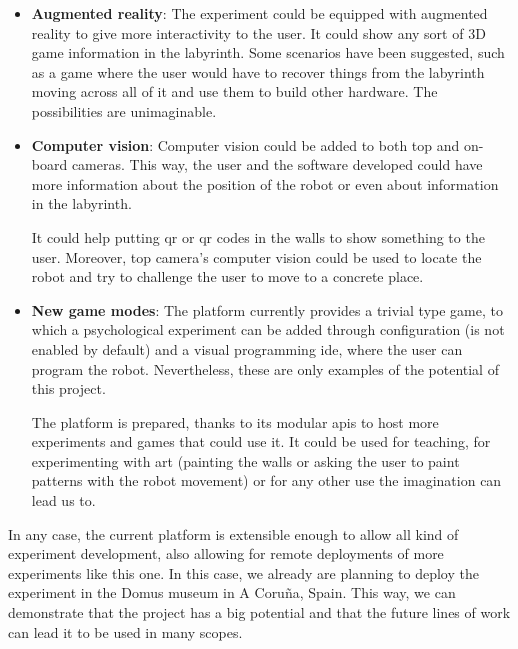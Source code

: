 \begin{itemize}

	\item \textbf{Augmented reality}: The experiment could be equipped with augmented reality to give
	more interactivity to the user. It could show any sort of 3D game information in the labyrinth. Some
	scenarios have been suggested, such as a game where the user would have to recover things from the
	labyrinth moving across all of it and use them to build other hardware. The possibilities are
	unimaginable.

	\item \textbf{Computer vision}: Computer vision could be added to both top and on-board cameras.
	This way, the user and the software developed could have more information about the position of the
	robot or even about information in the labyrinth.

	It could help putting \acrshort{qr} or
	\acrlong{qr} codes in the walls to show something to the user. Moreover, top camera's computer
	vision could be used to locate the robot and try to challenge the user to move to a concrete place.

	\item \textbf{New game modes}: The platform currently provides a trivial type game, to which a
	psychological experiment can be added through configuration (is not enabled by default) and a visual
	programming \acrshort{ide}, where the user can program the robot. Nevertheless, these are only
	examples of the potential of this project.

	The platform is prepared, thanks to its modular \acrshort{api}s to host more experiments and games
	that could use it. It could be used for teaching, for experimenting with art (painting the walls or
	asking the user to paint patterns with the robot movement) or for any other use the imagination can
	lead us to.

\end{itemize}

In any case, the current platform is extensible enough to allow all kind of experiment development,
also allowing for remote deployments of more experiments like this one. In this case, we already
are planning to deploy the experiment in the Domus museum in A Coruña, Spain. This way, we can
demonstrate that the project has a big potential and that the future lines of work can lead it to
be used in many scopes.
